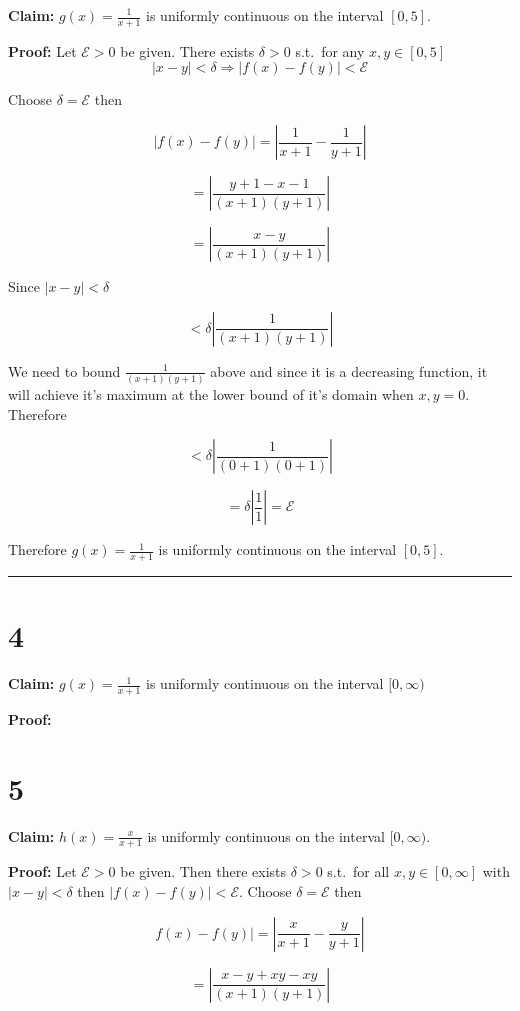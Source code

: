 \documentclass[10pt,letterpaper]{article}
\newcommand\E{\mathcal{E}}
\newcommand\qedsym{\hfill \rule{2mm}{2mm}}
\begin{document}
\textbf{Claim:} $g(x) = \frac{1}{x+1}$ is uniformly continuous on the interval $[0,5]$.

\medskip

\textbf{Proof:} Let $\E > 0$ be given. There exists $\delta > 0$ s.t.\ for any $x, y \in [0,5]$ \[|x-y| < \delta \Rightarrow |f(x) - f(y)| < \E\]

Choose $\delta = \E$ then

\[|f(x) - f(y)| = \left|\frac{1}{x+1} - \frac{1}{y+1}\right|\]

\[ = \left|\frac{y+1-x-1}{(x+1)(y+1)}\right|\]

\[ = \left|\frac{x-y}{(x+1)(y+1)}\right|\]

Since $|x-y| < \delta$

\[< \delta\left|\frac{1}{(x+1)(y+1)}\right|\]

We need to bound $\frac{1}{(x+1)(y+1)}$ above and since it is a decreasing function, it will achieve it's maximum at the lower bound of it's domain when $x,y = 0$. Therefore

\[ < \delta\left|\frac{1}{(0+1)(0+1)}\right|\]

\[ = \delta\left|\frac{1}{1}\right| = \E\]

Therefore $g(x) = \frac{1}{x+1}$ is uniformly continuous on the interval $[0,5]$.

\qedsym

\section*{4}

\textbf{Claim:} $g(x) = \frac{1}{x+1}$ is uniformly continuous on the interval $[0,\infty)$

\medskip

\textbf{Proof:}

\section*{5}

\textbf{Claim:} $h(x) = \frac{x}{x+1}$ is uniformly continuous on the interval $[0, \infty)$.

\medskip

\textbf{Proof:} Let $\E > 0$ be given. Then there exists $\delta > 0$ s.t.\ for all $x,y\in[0,\infty]$ with $|x-y|<\delta$ then $|f(x)-f(y)| < \E$. Choose $\delta = \E$ then

\[f(x)-f(y)| = \left|\frac{x}{x+1}-\frac{y}{y+1}\right|\]

\[= \left|\frac{x-y+xy-xy}{(x+1)(y+1)}\right|\]
\end{document}
